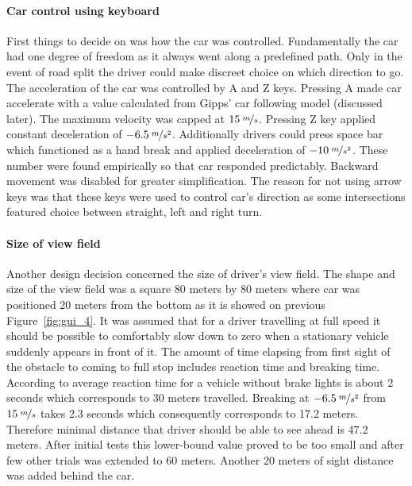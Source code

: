\documentclass[11pt,english,twoside]{article}
\begin{document}
\paragraph{Car control using keyboard}
First things to decide on was how the car was controlled. Fundamentally the car had one degree of freedom as it always went along a predefined path. Only in the event of road split the driver could make discreet choice on which direction to go. The acceleration of the car was controlled by A and Z keys. Pressing A made car accelerate with a value calculated from Gipps' car following model (discussed later). The maximum velocity was capped at $15\:\nicefrac{m}{s}$. Pressing Z key applied constant deceleration of $-6.5\:\nicefrac{m}{s^2}$. Additionally drivers could press space bar which functioned as a hand break and applied deceleration of $-10\:\nicefrac{m}{s^2}$. These number were found empirically so that car responded predictably. Backward movement was disabled for greater simplification.
The reason for not using arrow keys was that these keys were used to control car's direction as some intersections featured choice between straight, left and right turn. 


\paragraph{Size of view field}
Another design decision concerned the size of driver's view field. The shape and size of the view field was a square 80 meters by 80 meters where car was positioned 20 meters from the bottom as it is showed on previous Figure~\ref{fig:gui_4}. It was assumed that for a driver travelling at full speed it should be possible to comfortably slow down to zero when a stationary vehicle suddenly appears in front of it. The amount of time elapsing from first sight of the obstacle to coming to full stop includes reaction time and breaking time. According to \citep{summala1998driving} average reaction time for a vehicle without brake lights is about 2 seconds which corresponds to 30 meters travelled. Breaking at $-6.5\:\nicefrac{m}{s^2}$ from $15\:\nicefrac{m}{s}$ takes 2.3 seconds which consequently corresponds to 17.2 meters. Therefore minimal distance that driver should be able to see ahead is 47.2 meters. After initial tests this lower-bound value proved to be too small and after few other trials was extended to 60 meters. Another 20 meters of sight distance was added behind the car. 
\end{document}
